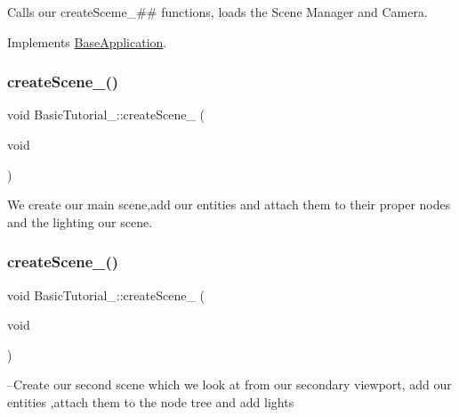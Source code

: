 Calls our create\+Sceme\+\_\+\#\# functions, loads the Scene Manager and Camera. 



 

Implements \hyperlink{class_base_application}{Base\+Application}.

\mbox{\label{class_basic_tutorial__00_aa84173e509858146cbfb98274c1ef56e}} 
\subsubsection{\texorpdfstring{create\+Scene\+\_()}{createScene\_00()}}
{\footnotesize\ttfamily void Basic\+Tutorial\+\_\+::create\+Scene\+\_ (\begin{DoxyParamCaption}\item[{void}]{ }\end{DoxyParamCaption})\hspace{0.3cm}{\ttfamily [protected]}}



We create our main scene,add our entities and attach them to their proper nodes and the lighting our scene. 



 \mbox{\label{class_basic_tutorial__00_aad14e1ca565797c4b7dcff31bc0e1494}} 
\subsubsection{\texorpdfstring{create\+Scene\+\_()}{createScene\_01()}}
{\footnotesize\ttfamily void Basic\+Tutorial\+\_\+::create\+Scene\+\_ (\begin{DoxyParamCaption}\item[{void}]{ }\end{DoxyParamCaption})\hspace{0.3cm}{\ttfamily [protected]}}



 --Create our second scene which we look at from our secondary viewport, add our entities ,attach them to the node tree and add lights \mbox{\label{class_basic_tutorial__00_a6d4684502f2f7b2cf628a975d7750d8e}} 

